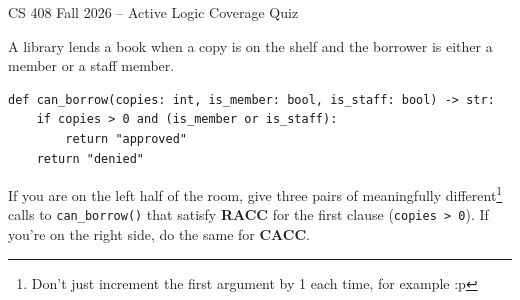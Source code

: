 \documentclass[addpoints]{exam}
\begin{document}
\thispagestyle{empty}

\begin{center}
	{\LARGE CS 408 Fall 2026 -- Active Logic Coverage Quiz \\}
\end{center}

\vspace{5mm}

\vspace{10mm}


\begin{questions}

\question A library lends a book when a copy is on the shelf and the
  borrower is either a member or a staff member.

\begin{verbatim}
def can_borrow(copies: int, is_member: bool, is_staff: bool) -> str:
    if copies > 0 and (is_member or is_staff):
        return "approved"
    return "denied"
\end{verbatim}

  If you are on the left half of the room, give three pairs of
  meaningfully different\footnote{Don't just increment the first
    argument by 1 each time, for example :p} calls to
  \texttt{can_borrow()} that satisfy \textbf{RACC} for the
  first clause (\texttt{copies > 0}). If you're on the
  right side, do the same for \textbf{CACC}.   %

\end{questions}
\end{document}
